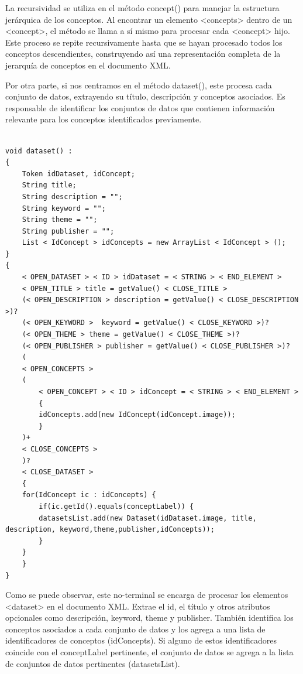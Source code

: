 La recursividad se utiliza en el método concept() para manejar la estructura jerárquica de los conceptos. Al encontrar un elemento <concepts> dentro de un <concept>, el método se llama a sí mismo para procesar cada <concept> hijo. Este proceso se repite recursivamente hasta que se hayan procesado todos los conceptos descendientes, construyendo así una representación completa de la jerarquía de conceptos en el documento XML.

Por otra parte, si nos centramos en el método dataset(), este  procesa cada conjunto de datos, extrayendo su título, descripción y conceptos asociados. Es responsable de identificar los conjuntos de datos que contienen información relevante para los conceptos identificados previamente.

\lstset{inputencoding=utf8/latin1}
\begin{lstlisting}
    
void dataset() :
{
    Token idDataset, idConcept;
    String title;
    String description = "";
    String keyword = "";
    String theme = "";
    String publisher = "";
    List < IdConcept > idConcepts = new ArrayList < IdConcept > ();
} 
{
    < OPEN_DATASET > < ID > idDataset = < STRING > < END_ELEMENT > 
    < OPEN_TITLE > title = getValue() < CLOSE_TITLE > 
    (< OPEN_DESCRIPTION > description = getValue() < CLOSE_DESCRIPTION >)?
    (< OPEN_KEYWORD >  keyword = getValue() < CLOSE_KEYWORD >)?
    (< OPEN_THEME > theme = getValue() < CLOSE_THEME >)?
    (< OPEN_PUBLISHER > publisher = getValue() < CLOSE_PUBLISHER >)?
    (
    < OPEN_CONCEPTS >
    (
        < OPEN_CONCEPT > < ID > idConcept = < STRING > < END_ELEMENT >
        {
        idConcepts.add(new IdConcept(idConcept.image));
        }
    )+
    < CLOSE_CONCEPTS >
    )?
    < CLOSE_DATASET >
    {
    for(IdConcept ic : idConcepts) {
        if(ic.getId().equals(conceptLabel)) {
        datasetsList.add(new Dataset(idDataset.image, title, description, keyword,theme,publisher,idConcepts));
        }
    }
    }
}   

\end{lstlisting}

Como se puede observar, este no-terminal se encarga de procesar los elementos <dataset> en el documento XML. Extrae el id, el título y otros atributos opcionales como descripción, keyword, theme y publisher. También identifica los conceptos asociados a cada conjunto de datos y los agrega a una lista de identificadores de conceptos (idConcepts). Si alguno de estos identificadores coincide con el conceptLabel pertinente, el conjunto de datos se agrega a la lista de conjuntos de datos pertinentes (datasetsList).

